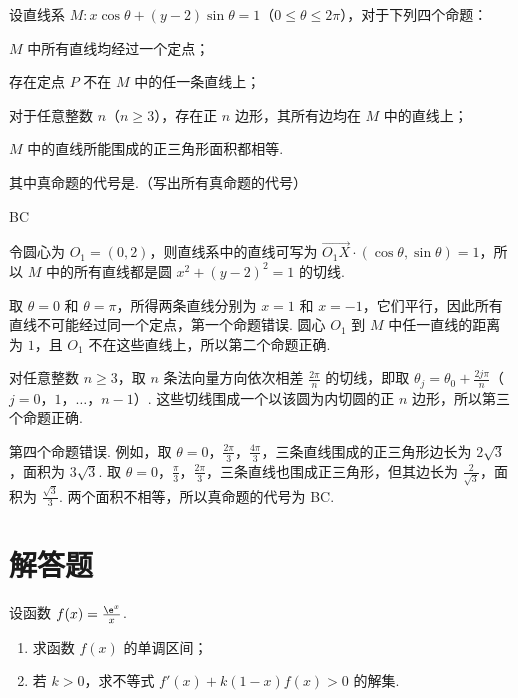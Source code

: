 \begin{problem}
设直线系 \(M: x \cos \theta + (y - 2) \sin \theta = 1\)（\(0 \leqslant \theta \leqslant 2\pi\)），对于下列四个命题：

\begin{circlelist}
\item \(M\) 中所有直线均经过一个定点；
\item 存在定点 \(P\) 不在 \(M\) 中的任一条直线上；
\item 对于任意整数 \(n\)（\(n \geqslant 3\)），存在正 \(n\) 边形，其所有边均在 \(M\) 中的直线上；
\item \(M\) 中的直线所能围成的正三角形面积都相等.
\end{circlelist}

其中真命题的代号是\fillinblank{}.（写出所有真命题的代号）
\end{problem}

\begin{answer}
BC
\end{answer}

\begin{solution}
令圆心为 \(O_{1}=(0,2)\)，则直线系中的直线可写为
\(\overrightarrow{O_{1}X}\cdot(\cos\theta,\sin\theta)=1\)，所以 \(M\) 中的所有直线都是圆 \(x^{2}+(y-2)^{2}=1\) 的切线.

取 \(\theta=0\) 和 \(\theta=\pi\)，所得两条直线分别为 \(x=1\) 和 \(x=-1\)，它们平行，因此所有直线不可能经过同一个定点，第一个命题错误. 圆心 \(O_{1}\) 到 \(M\) 中任一直线的距离为 \(1\)，且 \(O_{1}\) 不在这些直线上，所以第二个命题正确.

对任意整数 \(n\geqslant3\)，取 \(n\) 条法向量方向依次相差 \(\frac{2\pi}{n}\) 的切线，即取 \(\theta_{j}=\theta_{0}+\frac{2j\pi}{n}\)（\(j=0\)，\(1\)，\(\ldots\)，\(n-1\)）. 这些切线围成一个以该圆为内切圆的正 \(n\) 边形，所以第三个命题正确.

第四个命题错误. 例如，取 \(\theta=0\)，\(\frac{2\pi}{3}\)，\(\frac{4\pi}{3}\)，三条直线围成的正三角形边长为 \(2\sqrt{3}\)，面积为 \(3\sqrt{3}\). 取 \(\theta=0\)，\(\frac{\pi}{3}\)，\(\frac{2\pi}{3}\)，三条直线也围成正三角形，但其边长为 \(\frac{2}{\sqrt{3}}\)，面积为 \(\frac{\sqrt{3}}{3}\). 两个面积不相等，所以真命题的代号为 BC.
\end{solution}

\section{解答题}

\begin{problem}
设函数 \( f(x) = \frac{\e^x}{x} \).

\begin{enumerate}
\item 求函数 \( f(x) \) 的单调区间；
\item 若 \(k > 0\)，求不等式 \(f'(x) + k(1 - x)f(x) > 0\) 的解集.
\end{enumerate}
\end{problem}

